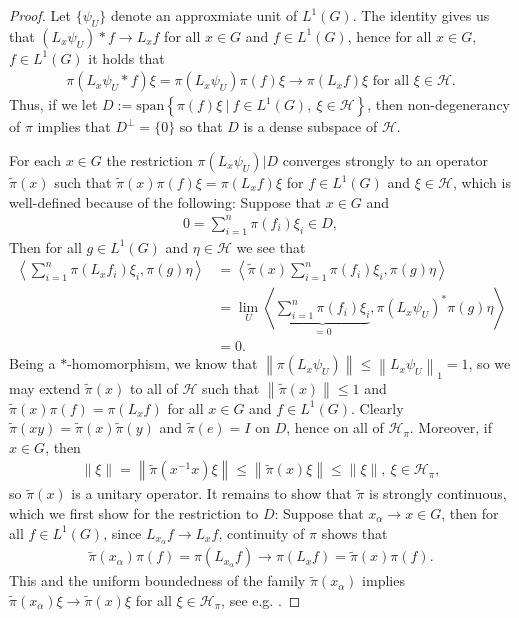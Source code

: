 \documentclass[10pt,twoside,openany,final]{memoir}
\theoremstyle{definition}
\theoremstyle{Break}
\newcommand{\lv}{\left\lVert}
\newcommand{\rv}{\right\rVert}
\renewcommand{\H}{\mathcal{H}}
\begin{document}
\begin{proof}
	Let $\{\psi_U\}$ denote an approxmiate unit of $L^1(G)$. The identity  gives us that $(L_x \psi_U) \ast f \to L_x f$ for all $x \in G$ and $f \in L^1(G)$, hence for all $x \in G$, $f \in L^1(G)$ it holds that
	\begin{align*}
		\pi(L_x \psi_U \ast f)\xi = \pi(L_x \psi_U)\pi(f) \xi \to \pi(L_x f) \xi  \text{ for all } \xi \in \H.
	\end{align*}
	Thus, if we let $D:=\textrm{span}\left\{  \pi(f) \xi \ \big| \ f \in L^1(G), \ \xi \in \H \right\}$, then non-degenerancy of $\pi$ implies that $D^\perp=\{0\}$ so that $D$ is a dense subspace of $\H$. 
	
	For each $x \in G$ the restriction $\pi(L_x \psi_U)|D$ converges strongly to an operator $\tilde{\pi}(x)$ such that $\tilde{\pi}(x)\pi(f) \xi = \pi(L_x f ) \xi$ for $f \in L^1(G)$ and $\xi \in \H$, which is well-defined because of the following: Suppose that $x \in G$ and 
	\begin{align*}
		0=\sum_{i=1}^n \pi(f_i) \xi_i \in D,
	\end{align*}
	Then for all $g \in L^1(G)$ and $\eta \in \H$ we see that
	\begin{align*}
		\left\langle \sum_{i=1}^n \pi(L_x f_i) \xi_i, \pi(g) \eta \right\rangle&=\left\langle \tilde{\pi}(x) \sum_{i=1}^n \pi(f_i)\xi_i, \pi(g)\eta\right\rangle\\
		&=\lim_{U}\left\langle \underbrace{\sum_{i=1}^n \pi(f_i) \xi_i}_{=0}, \pi(L_x \psi_U)^* \pi(g) \eta\right\rangle\\
		&=0.
	\end{align*}
	Being a $*$-homomorphism, we know that $\lv \pi(L_x \psi_U)\rv \leq \lv L_x \psi_U \rv_1=1$, so we may extend $\tilde{\pi}(x)$ to all of $\H$ such that $\lv \tilde{\pi}(x) \rv \leq 1$ and $\tilde{\pi}(x) \pi(f) = \pi(L_x f)$ for all $x \in G$ and $f \in L^1(G)$. Clearly $\tilde{\pi}(xy)=\tilde{\pi}(x)\tilde{\pi}(y)$ and $\tilde{\pi}(e)=I$ on $D$, hence on all of $\H_\pi$. Moreover, if $x \in G$, then
	\begin{align*}
		\lv \xi \rv = \lv \tilde{\pi}(x^{-1}x)\xi \rv \leq \lv \tilde{\pi}(x) \xi \rv \leq \lv \xi \rv, \ \xi \in \H_\pi,
	\end{align*}
	so $\tilde{\pi}(x)$ is a unitary operator. It remains to show that $\tilde{\pi}$ is strongly continuous, which we first show for the restriction to $D$:
	Suppose that $x_{\alpha} \to x \in G$, then for all $f \in L^1(G)$, since $L_{x_{\alpha}}f \to L_x f$, continuity of $\pi$ shows that
	\begin{align*}
		\tilde{\pi}(x_{\alpha}) \pi(f) = \pi(L_{x_{\alpha}}f) \to \pi(L_x f) = \tilde{\pi}(x) \pi(f).
	\end{align*}
This and the uniform boundedness of the family $\tilde{\pi}(x_{\alpha})$ implies $\tilde{\pi}(x_{\alpha}) \xi \to \tilde{\pi}(x)\xi$ for all $\xi \in \H_\pi$, see e.g. \cite[262]{conway2013course}. 


\end{proof}
\end{document}
